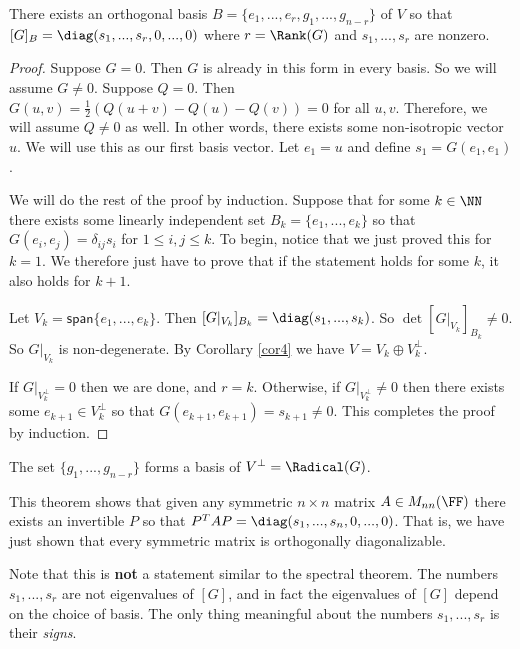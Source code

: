 \begin{thm}\label{thm:orthogonaldiag}
    There exists an orthogonal basis $B = \{e_1,...,e_r,g_1,...,g_{n-r}\}$ of $V$ so that $[G]_B = \diag(s_1,...,s_r,0,...,0)$ where $r = \Rank(G)$ and $s_1,...,s_r$ are nonzero.
\end{thm}

\begin{proof}
    Suppose $G = 0$. Then $G$ is already in this form in every basis. So we will assume $G \neq 0$. Suppose $Q = 0$. Then $G(u,v) = \frac{1}{2}(Q(u+v)-Q(u)-Q(v))=0$ for all $u,v$. Therefore, we will assume $Q\neq 0$ as well. In other words, there exists some non-isotropic vector $u$. We will use this as our first basis vector. Let $e_1 = u$ and define $s_1 = G(e_1,e_1)$. 
    
    We will do the rest of the proof by induction. Suppose that for some $k \in \NN$ there exists some linearly independent set $B_k =\{e_1,...,e_k\}$ so that $G(e_i,e_j) = \delta_{ij}s_i$ for $1\leq i,j \leq k$. To begin, notice that we just proved this for $k=1$. We therefore just have to prove that if the statement holds for some $k$, it also holds for $k+1$.

    Let $V_k = \textsf{span}\{e_1,...,e_k\}$. Then $[G|_{V_k}]_{B_k} = \diag(s_1,...,s_k)$. So $\det [G|_{V_k}]_{B_k} \neq 0$. So $G|_{V_k}$ is non-degenerate. By Corollary \ref{cor4} we have $V = V_k \oplus V_k^\perp$.

    If $G|_{V_k^\perp}=0$ then we are done, and $r=k$. Otherwise, if $G|_{V_k^\perp}\neq 0$ then there exists some $e_{k+1}\in V_k^\perp$ so that $G(e_{k+1},e_{k+1})=s_{k+1}\neq 0$. This completes the proof by induction.
\end{proof}
\begin{remark*}
    The set $\{g_1,...,g_{n-r}\}$ forms a basis of $V^\perp = \Radical(G)$.
\end{remark*}
\begin{remark*}
    This theorem shows that given any symmetric $n\times n$ matrix $A\in M_{nn}(\FF)$ there exists an invertible $P$ so that $P^T A P = \diag(s_1,...,s_n,0,...,0)$. That is, we have just shown that every symmetric matrix is orthogonally diagonalizable. 
\end{remark*}

\begin{remark*}
    Note that this is \textbf{not} a statement similar to the spectral theorem. The numbers $s_1,...,s_r$ are not eigenvalues of $[G]$, and in fact the eigenvalues of $[G]$ depend on the choice of basis. The only thing meaningful about the numbers $s_1,...,s_r$ is their \textit{signs}.
\end{remark*}

